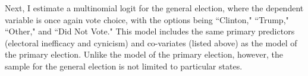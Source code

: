 \documentclass[12pt]{article}
\begin{document}
 Next, I estimate a multinomial logit for the general election, where the dependent variable is once again vote choice, with the options being ``Clinton," ``Trump," ``Other," and ``Did Not Vote." This model includes the same primary predictors (electoral inefficacy and cynicism) and co-variates (listed above) as the model of the primary election. Unlike the model of the primary election, however, the sample for the general election is not limited to particular states. 
  











\end{document}
